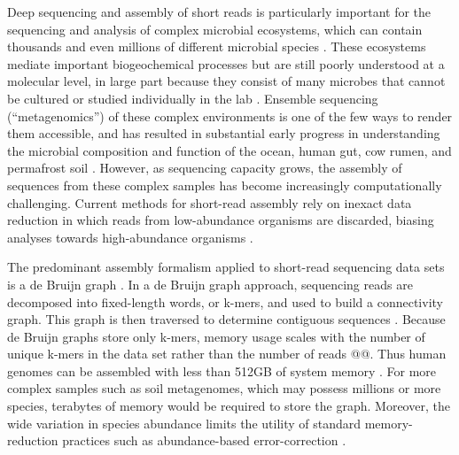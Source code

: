 \documentclass{pnastwo}
\begin{document}
\begin{article}
Deep sequencing and assembly of short reads is particularly important
for the sequencing and analysis of complex microbial ecosystems, which
can contain thousands and even millions of different microbial species
\cite{pubmed20195499,pubmed16123304}.  These ecosystems mediate
important biogeochemical processes but are still poorly understood at
a molecular level, in large part because they consist of many microbes
that cannot be cultured or studied individually in the lab
\cite{pubmed20195499}.  Ensemble sequencing (``metagenomics'') of
these complex environments is one of the few ways to render them
accessible, and has resulted in substantial early progress in
understanding the microbial composition and function of the ocean,
human gut, cow rumen, and permafrost soil
\cite{metahit,rumen,sargasso,permafrost}.  However, as sequencing
capacity grows, the assembly of sequences from these complex samples
has become increasingly computationally challenging.  Current methods
for short-read assembly rely on inexact data reduction in which reads
from low-abundance organisms are discarded, biasing analyses towards
high-abundance organisms \cite{metahit,rumen,permafrost}.


The predominant assembly formalism applied to short-read sequencing
data sets is a de Bruijn graph
\cite{pubmed11504945,pubmed20211242,pubmed22068540}.  In a de Bruijn
graph approach, sequencing reads are decomposed into fixed-length
words, or k-mers, and used to build a connectivity graph.  This graph
is then traversed to determine contiguous sequences
\cite{pubmed22068540}.  Because de Bruijn graphs store only k-mers,
memory usage scales with the number of unique k-mers in the data set
rather than the number of reads @@.  Thus human genomes can be
assembled with less than 512GB of system memory \cite{pmid21187386}.
For more complex samples such as soil metagenomes, which may possess
millions or more species, terabytes of memory would be required to
store the graph.  Moreover, the wide variation in species abundance
limits the utility of standard memory-reduction practices such as
abundance-based error-correction \cite{pubmed21114842}.


\end{article}
\end{document}
